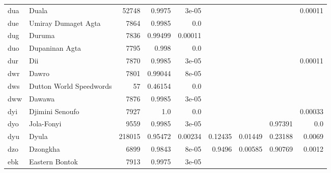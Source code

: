 \documentclass[11pt]{article}
\begin{document}
\begin{table*}[h]
{\begin{tabular}{llrrrrrrr}
dua         & Duala         & 52748         & 0.9975         & 3e-05         &          &          &          & 0.00011         \\

due         & Umiray Dumaget Agta         & 7864         & 0.9985         & 0.0         &          &          &          &          \\

dug         & Duruma         & 7836         & 0.99499         & 0.00011         &          &          &          &          \\

duo         & Dupaninan Agta         & 7795         & 0.998         & 0.0         &          &          &          &          \\

dur         & Dii         & 7870         & 0.9985         & 3e-05         &          &          &          & 0.00011         \\

dwr         & Dawro         & 7801         & 0.99044         & 8e-05         &          &          &          &          \\

dws         & Dutton World Speedwords         & 57         & 0.46154         & 0.0         &          &          &          &          \\

dww         & Dawawa         & 7876         & 0.9985         & 3e-05         &          &          &          &          \\

dyi         & Djimini Senoufo         & 7927         & 1.0         & 0.0         &          &          &          & 0.00033         \\

dyo         & Jola-Fonyi         & 9559         & 0.9985         & 3e-05         &          &          & 0.97391         & 0.0         \\

dyu         & Dyula         & 218015         & 0.95472         & 0.00234         & 0.12435         & 0.01449         & 0.23188         & 0.0069         \\

dzo         & Dzongkha         & 6899         & 0.9843         & 8e-05         & 0.9496         & 0.00585         & 0.90769         & 0.0012         \\

ebk         & Eastern Bontok         & 7913         & 0.9975         & 3e-05         &          &          &          &          \\


\end{tabular}}
\end{table*}
\end{document}

